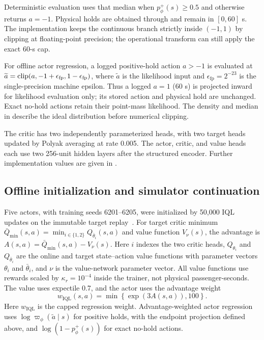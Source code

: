 Deterministic evaluation uses that median when $p^+_{\phi}(s)\geq0.5$ and
otherwise returns $a=-1$. Physical holds are obtained through
 and remain in $[0,60]$ s. The implementation keeps the
continuous branch strictly inside $(-1,1)$ by clipping at floating-point
precision; the operational transform can still apply the exact 60-s cap.

For offline actor regression, a logged positive-hold action $a>-1$ is evaluated
at $\widetilde a=\operatorname{clip}(a,-1+\epsilon_{\mathrm{fp}},1-\epsilon_{\mathrm{fp}})$,
where $\widetilde a$ is the likelihood input and
$\epsilon_{\mathrm{fp}}=2^{-23}$ is the single-precision machine epsilon.
Thus a logged $a=1$ (60 s) is projected inward for likelihood evaluation only;
its stored action and physical hold are unchanged. Exact no-hold actions retain
their point-mass likelihood. The density and median in 
describe the ideal distribution before numerical clipping.

The critic has two independently parameterized heads, with two target heads
updated by Polyak averaging at rate 0.005. The actor, critic, and value heads
each use two 256-unit hidden layers after the structured encoder. Further
implementation values are given in .

\subsection{Offline initialization and simulator continuation}
\label{sec:method:training}

Five actors, with training seeds 6201--6205, were initialized by 50,000 IQL
updates on the immutable target replay~\citep{kostrikov2022iql}. For target
critic minimum $\bar Q_{\min}(s,a)=\min_{i\in\{1,2\}}Q_{\bar\theta_i}(s,a)$
and value function $V_{\nu}(s)$, the advantage
is $A(s,a)=\bar Q_{\min}(s,a)-V_{\nu}(s)$. Here $i$ indexes the two critic
heads, $Q_{\theta_i}$ and $Q_{\bar\theta_i}$ are the online and target
state--action value functions with parameter vectors $\theta_i$ and
$\bar\theta_i$, and $\nu$ is the value-network parameter vector.
All value functions use rewards
scaled by $\kappa_r=10^{-4}$ inside the trainer, not physical passenger-seconds.
The value uses expectile 0.7, and the
actor uses the advantage weight
\begin{equation}
w_{\mathrm{IQL}}(s,a)=
\min\left\{\exp\left(3A(s,a)\right),100\right\}.
\label{eq:iql_weight}
\end{equation}
Here $w_{\mathrm{IQL}}$ is the capped regression weight. Advantage-weighted
actor regression uses $\log\varpi_{\phi}(\widetilde a\mid s)$ for positive
holds, with the endpoint projection defined above, and
$\log(1-p^+_{\phi}(s))$ for exact no-hold actions.

